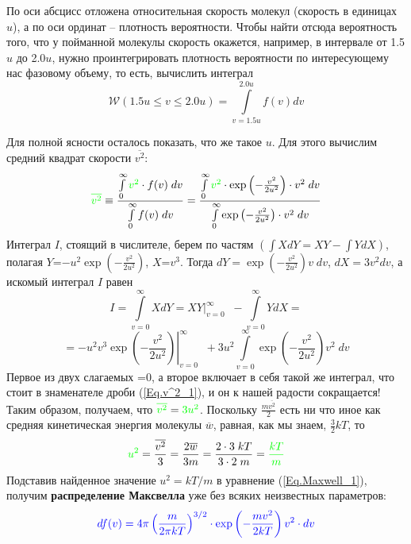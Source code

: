 \documentclass[12pt,epsfig,color,russian]{article}
\begin{document}
По оси абсцисс отложена относительная скорость молекул (скорость в единицах $u$), а по оси ординат -- плотность вероятности. Чтобы найти отсюда вероятность того, что у пойманной молекулы скорость окажется, например, в интервале от 1.5$u$ до 2.0$u$, нужно проинтегрировать плотность вероятности по ин\-те\-ре\-су\-ю\-ще\-му нас фазовому объему, то есть, вычислить интеграл
\begin{displaymath}
\mathcal{W}(1.5u\leq v\leq2.0u)=\int\limits_{v=1.5u}^{2.0u}f(v)dv
\end{displaymath}


Для полной ясности осталось показать, что же такое $u$. Для этого вычислим средний квадрат скорости {\color{green}$\overline{v^2}$}:
\begin{equation}\label{Eq.v^2_1}
{\color{green}\overline{v^2}}\equiv\frac{\int\limits_0^\infty {\color{green}v^2}\cdot f(v)\;dv}
                         {\int\limits_0^\infty f(v)\;dv}=
\frac{\int\limits_0^\infty {\color{green}v^2}\cdot\exp\left(-\frac{v^2}{2u^2}\right) \cdot v^2\;dv}
                         {\int\limits_0^\infty \exp\left(-\frac{v^2}{2u^2}\right) \cdot v^2\;dv}
\end{equation}
Интеграл $I$, стоящий в числителе, берем по частям $\left(\int XdY=XY-\int YdX\right)$, полагая $Y$=$-u^2\exp\left(-\frac{v^2}{2u^2}\right)$, $X$=$v^3$. Тогда $dY=\exp\left(-\frac{v^2}{2u^2}\right)v\;dv$, $dX=3v^2dv$, а искомый интеграл $I$ равен
\begin{displaymath}
I=\int\limits_{v=0}^\infty XdY = \left.XY\right|_{v=0}^\infty\;\;-\int\limits_{v=0}^\infty YdX =
\end{displaymath}
\begin{displaymath}
 =\left.-u^2v^3\exp\left(-\frac{v^2}{2u^2}\right)\right|_{v=0}^\infty\;\;
 +3u^2\int\limits_{v=0}^\infty\exp\left(-\frac{v^2}{2u^2}\right)v^2\;dv
\end{displaymath}
Первое из двух слагаемых =0, а второе включает в себя такой же интеграл, что стоит в знаменателе дроби (\ref{Eq.v^2_1}), и он к нашей радости сокращается! Таким образом, получаем, что ${\color{green}\overline{v^2}}={\color{green}3u^2}$. Поскольку $\frac{m\overline{v^2}}2$ есть ни что иное как средняя кинетическая энергия молекулы $\overline{w}$, равная, как мы знаем, $\frac32kT$, то
\begin{equation}
{\color{green}u^2}=\frac{\overline{v^2}}3=\frac{2\overline{w}}{3m}= \frac{2\cdot3\;kT}{3\cdot2\;m}={\color{green}\frac{kT}m}
\end{equation}
Подставив найденное значение $u^2=kT/m$ в уравнение (\ref{Eq.Maxwell_1}), получим {\color{blue}\bf распределение Максвелла} уже без всяких неизвестных параметров:
\begin{equation}{\color{blue}
df(v)= 4\pi\left(\frac{m}{2\pi kT}\right)^{3/2}\cdot \exp\left(-\frac{mv^2}{2kT}\right)v^2\cdot dv
}
\end{equation}
\end{document}
